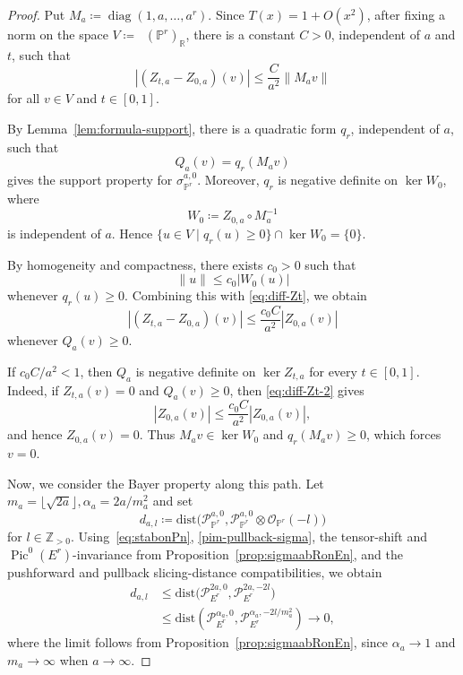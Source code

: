 \documentclass[11pt, reqno]{amsart}
\numberwithin{equation}{section}
\theoremstyle{plain}
\theoremstyle{remark}
\theoremstyle{definition}
\theoremstyle{italicsname}
\newcommand{\num}{\mathrm{num}}
\DeclareMathOperator{\Knum}{\rK_{\num}}
\DeclareMathOperator{\Pic}{Pic}
\newcommand{\cO}{\mathcal{O}}
\newcommand{\cP}{\mathscr{P}}
\newcommand{\rK}{\mathrm{K}}
\def\RR{\ensuremath{\mathbb{R}}}
\def\ZZ{\ensuremath{\mathbb{Z}}}
\def\PP{\ensuremath{\mathbb{P}}}
\begin{document}
\begin{proof}
Put $M_a\coloneqq\operatorname{diag}(1,a,\ldots,a^r)$. Since $T(x)=1+O(x^2)$, after fixing a norm on the space
$V\coloneqq\Knum(\PP^r)_{\RR}$, there is a constant $C>0$, independent
of $a$ and $t$, such that
\begin{equation}\label{eq:diff-Zt}
	\left|(Z_{t,a}-Z_{0,a})(v)\right|
	\leq\frac{C}{a^2}\|M_av\|
\end{equation}
for all $v\in V$ and $t\in[0,1]$.

By Lemma~\ref{lem:formula-support}, there is a quadratic form $q_r$,
independent of $a$, such that
\[
Q_a(v)=q_r(M_av)
\]
gives the support property for $\sigma_{\PP^r}^{a,0}$. Moreover, $q_r$
is negative definite on $\ker W_0$, where
\[
W_0\coloneqq Z_{0,a}\circ M_a^{-1}
\]
is independent of $a$. Hence $\{u\in V\mid q_r(u)\geq0\}\cap\ker W_0=\{0\}$.

By homogeneity and compactness, there exists $c_0>0$ such that
\[
\|u\|\leq c_0|W_0(u)|
\]
whenever $q_r(u)\geq0$. Combining this with \eqref{eq:diff-Zt}, we obtain
\begin{equation}\label{eq:diff-Zt-2}
	\left|(Z_{t,a}-Z_{0,a})(v)\right|
	\leq\frac{c_0C}{a^2}|Z_{0,a}(v)|
\end{equation}
whenever $Q_a(v)\geq0$.

If $c_0C/a^2<1$, then $Q_a$ is negative definite on
$\ker Z_{t,a}$ for every $t\in[0,1]$. Indeed, if
$Z_{t,a}(v)=0$ and $Q_a(v)\geq0$, then \eqref{eq:diff-Zt-2} gives
\[
|Z_{0,a}(v)|\leq\frac{c_0C}{a^2}|Z_{0,a}(v)|,
\]
and hence $Z_{0,a}(v)=0$. Thus
$M_av\in\ker W_0$ and $q_r(M_av)\geq0$, which forces $v=0$.

Now, we consider the Bayer property along this path. Let $
m_a=\lfloor\sqrt{2a}\rfloor,\alpha_a=2a / m_a^2$ and set
\[
d_{a,l}\coloneqq
\mathrm{dist}\bigl(
\cP_{\PP^r}^{a,0},
\cP_{\PP^r}^{a,0}\otimes\cO_{\PP^r}(-l)
\bigr)
\]
for $l\in\ZZ_{>0}$. Using~\eqref{eq:stabonPn}, \eqref{pim-pullback-sigma}, the tensor-shift
and $\Pic^0(E^r)$-invariance from Proposition~\ref{prop:sigmaabRonEn},
and the pushforward and pullback slicing-distance compatibilities, we
obtain
\[
\begin{aligned}
	d_{a,l}
	&\leq
	\mathrm{dist}\bigl(
	\cP_{E^r}^{2a,0},\cP_{E^r}^{2a,-2l}
	\bigr)\\
	&\leq
	\mathrm{dist}\left(
	\cP_{E^r}^{\alpha_a,0},
	\cP_{E^r}^{\alpha_a,-2l/m_a^2}
	\right)
	\longrightarrow0,
\end{aligned}
\]
where the limit follows from
Proposition~\ref{prop:sigmaabRonEn}, since $\alpha_a\to1$ and
$m_a\to\infty$ when $a\to \infty$.


\end{proof}
\end{document}
